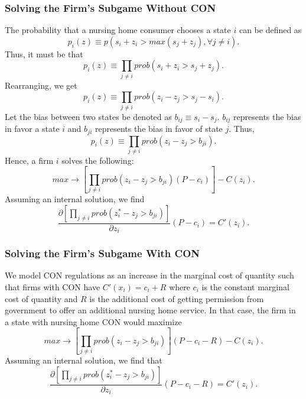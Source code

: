 \documentclass[../Main.tex]{subfiles}
\begin{document}
\subsubsection{Solving the Firm's Subgame Without CON}
The probability that a nursing home consumer chooses a state $i$ can be defined as \begin{equation}p_i(z) \equiv p(s_i + z_i > max(s_j + z_j), \forall j \neq i ).\end{equation}
Thus, it must be that \begin{equation}p_i(z) \equiv \prod_{j\neq i} prob(s_i + z_i > s_j + z_j). \end{equation} 
Rearranging, we get
 \begin{equation}p_i(z) \equiv \prod_{j\neq i} prob(z_i-z_j > s_j - s_i). \end{equation} 
Let the bias between two states be denoted as $b_{ij} \equiv s_i - s_j $. $b_{ij}$ represents the bias in favor a state $i$ and $b_{ji}$ represents the bias in favor of state $j$. Thus,\begin{equation}p_i(z) \equiv \prod_{j\neq i} prob(z_i -z_j > b_{ji}). \end{equation}  
Hence, a firm $i$ solves the following:\begin{equation}max \rightarrow [\prod_{j\neq i} prob(z_i -z_j > b_{ji})(P-c_i)] - C(z_i).\end{equation}
Assuming an internal solution, we find 
 \begin{equation}\frac{\partial [\prod_{j\neq i} prob(z_i^* -z_j > b_{ji})]}{\partial z_i}(P-c_i) = C'(z_i). \end{equation}

\subsubsection{Solving the Firm's Subgame With CON}

We model CON regulations as an increase in the marginal cost of quantity such that firms with CON have $C'(x_i) = c_i + R$ where $c_i$ is the constant marginal cost of quantity  and $R$ is the additional cost of getting permission from government to offer an additional nursing home service. In that case, the firm in a state with nursing home CON would maximize
\begin{equation} max \rightarrow [\prod_{j\neq i} prob(z_i -z_j > b_{ji})](P - c_i - R) - C(z_i). \end{equation}
Assuming an internal solution, we find that
 \begin{equation}\frac{\partial [\prod_{j\neq i} prob(z_i^* - z_j > b_{ji})]}{\partial z_i}(P - c_i - R) = C'(z_i). \end{equation}
\end{document}
